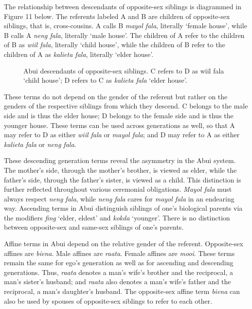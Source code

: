 The relationship between descendants of opposite-sex siblings is diagrammed in Figure 11 below. The referents labeled A and B are children of opposite-sex siblings, that is, cross-cousins. A calls B \textit{mayol fala}, literally `female house', while B calls A \textit{neng fala}, literally `male house'. The children of A refer to the children of B as \textit{wiil fala}, literally `child house', while the children of B refer to the children of A as \textit{kalieta fala}, literally `elder house'.

\begin{figure}
\caption{Abui descendants of opposite-sex siblings. C refers to D as wiil fala `child house'; D refers to C as \textit{kalieta fala} `elder house'.}
\end{figure}

These terms do not depend on the gender of the referent but rather on the genders of the respective siblings from which they descend. C belongs to the male side and is thus the elder house; D belongs to the female side and is thus the younger house. These terms can be used across generations as well, so that A may refer to D as either \textit{wiil fala} or \textit{mayol fala}; and D may refer to A as either \textit{kalieta fala} or \textit{neng fala}.

These descending generation terms reveal the asymmetry in the Abui system. The mother's side, through the mother's brother, is viewed as elder, while the father's side, through the father's sister, is viewed as a child. This distinction is further reflected throughout various ceremonial obligations. \textit{Mayol fala} must always respect \textit{neng fala}, while \textit{neng fala} cares for \textit{mayol fala} in an endearing way. Ascending terms in Abui distinguish siblings of one's biological parents via the modifiers \textit{fing} `elder, eldest' and \textit{kokda} `younger'. There is no distinction between opposite-sex and same-sex siblings of one's parents.

Affine terms in Abui depend on the relative gender of the referent. Opposite-sex affines are \textit{biena}. Male affines are \textit{raata}. Female affines are \textit{mooi}. These terms remain the same for ego's generation as well as for ascending and descending generations. Thus, \textit{raata} denotes a man's wife's brother and the reciprocal, a man's sister's husband; and \textit{raata} also denotes a man's wife's father and the reciprocal, a man's daughter's husband. The opposite-sex affine term \textit{biena} can also be used by spouses of opposite-sex siblings to refer to each other.


